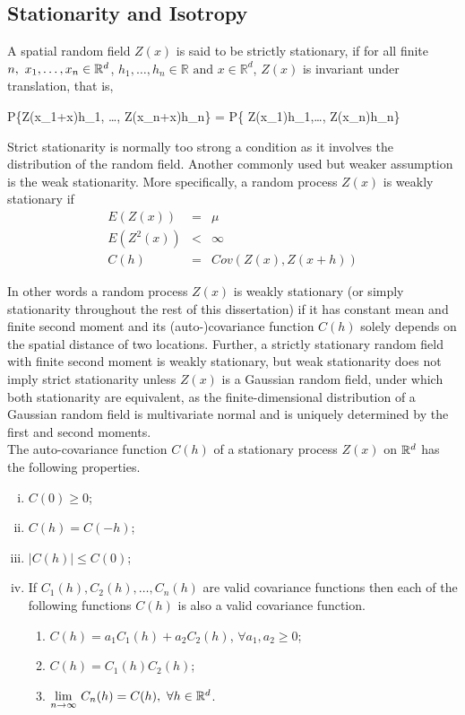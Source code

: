 \subsection{Stationarity and Isotropy}

A spatial random field $Z(x)$ is said to be strictly stationary, if for all finite $n,\ x_1,\ldots, x_n \in \mathbb{R}^d$, $h_1, \ldots, h_n\in\mathbb{R} \mbox{ and } x\in \mathbb{R}^d$, $Z(x)$ is invariant under translation, that is,

\beq
P\{Z(x_1+x)\le h_1, \ldots, Z(x_n+x)\le h_n\} = P\{ Z(x_1)\le h_1,\ldots, Z(x_n)\le h_n\}
\eeq

Strict stationarity is normally too strong a condition as it involves the distribution of the random field. Another commonly used but weaker assumption is the weak stationarity. More specifically, a random process $Z(x)$ is weakly stationary if
\begin{eqnarray}
	E(Z(x))   & = & \mu \nonumber \\
	E(Z^2(x)) & < & \infty \nonumber \\
	C(h)      & = & Cov(Z(x),Z(x+h))
\end{eqnarray}

In other words a random process $Z(x)$ is weakly stationary (or simply stationarity throughout the rest of this dissertation) if it has constant mean and finite second moment and its (auto-)covariance function $C(h)$ solely depends on the spatial distance of two locations. Further, a strictly stationary random field with finite second moment is weakly stationary, but weak stationarity does not imply strict stationarity unless $Z(x)$ is a Gaussian random field, under which both stationarity are equivalent, as the finite-dimensional distribution of a Gaussian random field is multivariate normal and is uniquely determined by the first and second moments. \\

The auto-covariance function $C(h)$ of a stationary process $Z(x)$ on $\mathbb{R}^d$ has the following properties.

\begin{enumerate}[(i)]
	\item $C(0) \ge 0$;
	\item $C(h) = C(-h)$;
	\item $|C(h)| \le  C(0)$;
	\item If $C_1(h), C_2(h), \ldots, C_n(h)$ are valid covariance functions then each of the following functions $C(h)$ is also a valid covariance function.
	
	      \begin{enumerate}
	      	\item $C(h) = a_1C_1(h)+a_2C_2(h)$, $\forall a_1,a_2\ge 0$;
	      	\item $C(h) = C_1(h)C_2(h)$;
	      	\item $\underset{n\to\infty} {\lim}\ C_n(h)=C(h),\ \forall h\in \R^d$.
	      \end{enumerate}
	
\end{enumerate}

